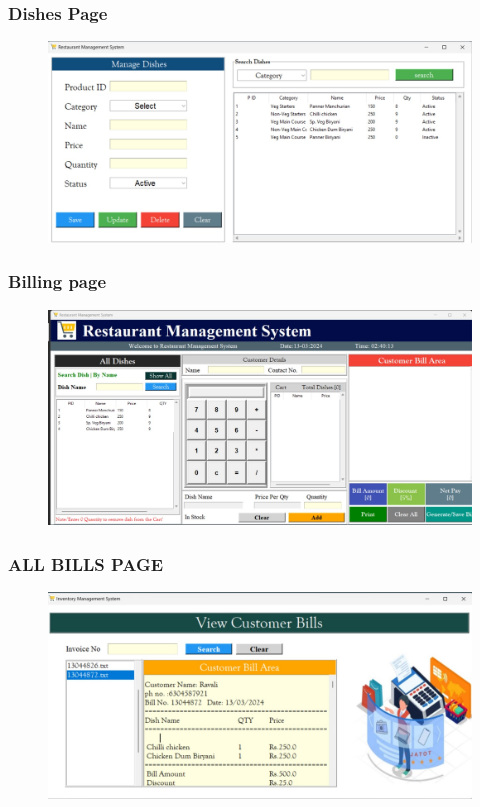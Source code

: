 \documentclass{beamer}
\begin{document}
\begin{frame}
  \frametitle{Dishes Page}
  \begin{figure}
    \centering
    \includegraphics[width=1.0\linewidth]{dishespage.jpg} 
  \end{figure}
\end{frame}



\begin{frame}
  \frametitle{Billing page}
  \begin{figure}
    \centering
    \includegraphics[width=1.0\linewidth]{billingpage.jpg} 
  \end{figure}
\end{frame}


\begin{frame}
  \frametitle{ALL BILLS PAGE}
  \begin{figure}
    \centering
    \includegraphics[width=1.0\linewidth]{allbillspage.jpg} 
  \end{figure}
\end{frame}
\end{document}
